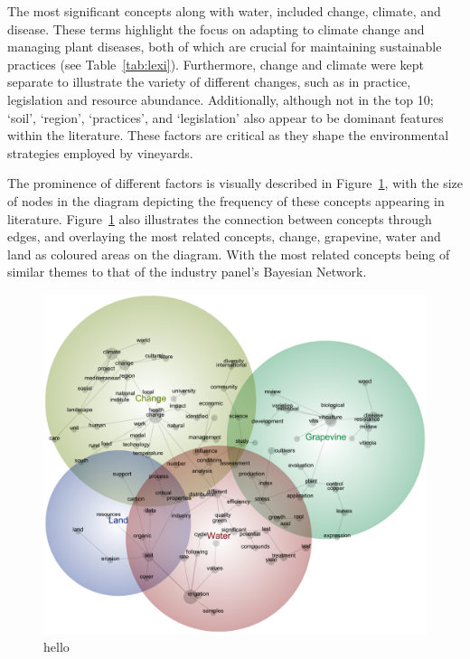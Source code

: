 \documentclass[fleqn,10pt]{wlscirep}
\begin{document}
The most significant concepts along with water, included change, climate, and disease. These terms highlight the focus on adapting to climate change and managing plant diseases, both of which are crucial for maintaining sustainable practices (see Table~\ref{tab:lexi}). Furthermore, change and climate were kept separate to illustrate the variety of different changes, such as in practice, legislation and resource abundance. Additionally, although not in the top 10; `soil', `region', `practices', and `legislation' also appear to be dominant features within the literature. These factors are critical as they shape the environmental strategies employed by vineyards.

The prominence of different factors is visually described in Figure~\ref{fig:lexi}, with the size of nodes in the diagram depicting the frequency of these concepts appearing in literature. Figure~\ref{fig:lexi} also illustrates the connection between concepts through edges, and overlaying the most related concepts, change, grapevine, water and land as coloured areas on the diagram. With the most related concepts being of similar themes to that of the industry panel's Bayesian Network.

\begin{figure}[h]
    \centering
    \includegraphics[width=\linewidth]{Winegrowing-concept-map}
    \caption{hello}\label{fig:lexi}
\end{figure}
\end{document}
